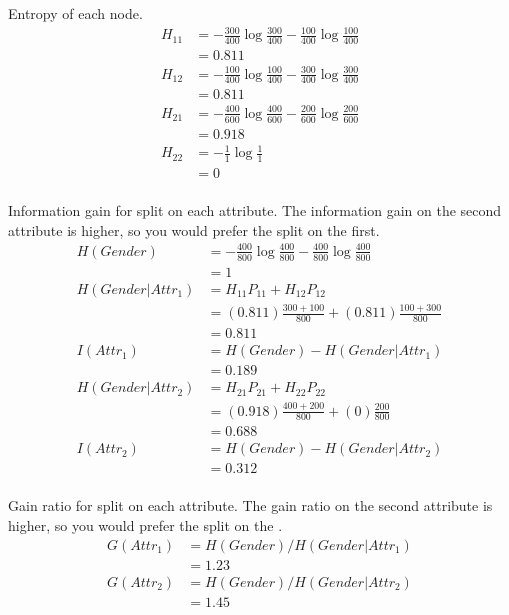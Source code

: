 \documentclass[newpage]{homework}
\begin{document}
\question
Entropy of each node.
\begin{align*}
    H_{11}	&=	-\frac{300}{400} \log \frac{300}{400}
                -\frac{100}{400} \log \frac{100}{400}	\\
            &=  0.811   \\
    H_{12}	&=	-\frac{100}{400} \log \frac{100}{400}
                -\frac{300}{400} \log \frac{300}{400}	\\
                &=  0.811   \\
    H_{21}	&=	-\frac{400}{600} \log \frac{400}{600}
                -\frac{200}{600} \log \frac{200}{600}	\\
            &=  0.918   \\
    H_{22}	&=	-\frac{1}{1} \log \frac{1}{1}   \\
            &=  0   \\
\end{align*}

Information gain for split on each attribute. The information gain on the second attribute is higher, so you would prefer the split on the  first.
\begin{align*}
    H(Gender)   &=  -\frac{400}{800} \log \frac{400}{800}
                    -\frac{400}{800} \log \frac{400}{800}\\
                &=  1   \\
    H(Gender | Attr_1)	&=	H_{11}P_{11} + H_{12}P_{12} \\
        &=  (0.811) \frac{300+100}{800} + (0.811) \frac{100+300}{800} \\
        &=	0.811	\\
    I(Attr_1)   &=  H(Gender) -  H(Gender | Attr_1) \\
        &=  0.189   \\
    H(Gender | Attr_2)	&=	H_{21}P_{21} + H_{22}P_{22} \\
        &=  (0.918) \frac{400+200}{800} + (0) \frac{200}{800} \\
        &=  0.688   \\
    I(Attr_2)   &=  H(Gender) -  H(Gender | Attr_2) \\
        &=  0.312   \\
\end{align*}

Gain ratio for split on each attribute. The gain ratio on the second attribute is higher, so you would prefer the split on the .
\begin{align*}
    G(Attr_1)   &=  H(Gender) /  H(Gender | Attr_1) \\
        &=  1.23   \\
    G(Attr_2)   &=  H(Gender) /  H(Gender | Attr_2) \\
        &=  1.45   \\
\end{align*}
\end{document}

